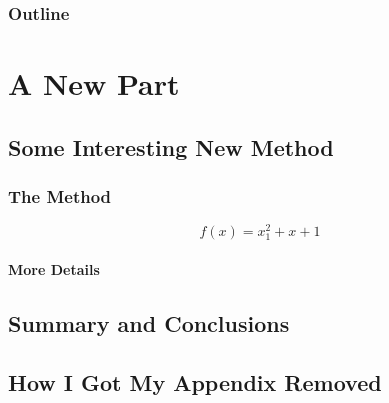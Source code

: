 \documentclass[english]{his-thesis}
\begin{document}
\lipsum[6-10]

\section{Outline}
\label{sec_outline}

\lipsum[11]

\part{A New Part}

\chapter{Some Interesting New Method}

\lipsum[13-14]

\section{The Method}

\lipsum[1]

\begin{equation}
\label{eq_the_method}
    f(x) = x_1^2 + x + 1
\end{equation}

\lipsum[2]

\subsection{More Details}

\cite{dlib09,dedrick2006scope,henkel2006revealingemblinux,fitzgerald2003trencheslessons}
\lipsum[15-19]

\chapter{Summary and Conclusions}
\label{chap_conclusions}

\lipsum[20-25]

\begin{appendix}

\chapter{How I Got My Appendix Removed}

\lipsum[23-42]

\end{appendix}

\begin{fullarticles}
\end{fullarticles}

\listofreferences

\dissertationlist
\end{document}
